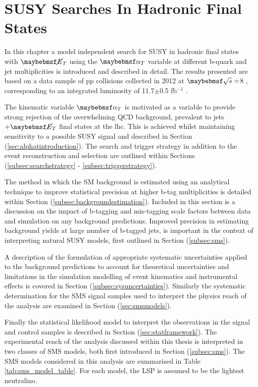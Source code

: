 \chapter{SUSY Searches In Hadronic Final States}
\label{chap:SUSYsearches}

In this chapter a model independent search for \ac{SUSY} in hadronic final states with $\met$ using the $\alphat$ variable at different b-quark and jet multiplicities is introduced and described in detail. The results presented are based on a data sample of pp collisions collected in 2012 at $\com =$8 \TeV, corresponding to an integrated luminosity of 11.7$\pm$0.5 fb$^{-1}$ \cite{ra1_epjc}.

The kinematic variable $\alphat$ is motivated as a variable to provide strong rejection of the overwhelming QCD background, prevalent to jets $+ \met$ final states at the \ac{lhc}. This is achieved whilst maintaining sensitivity to a possible \ac{SUSY} signal and described in Section (\ref{sec:alphatintroduction}). The search and trigger strategy in addition to the event reconstruction and selection are outlined within Sections (\ref{subsec:searchstrategy} - \ref{subsec:triggerstrategy}). 

The method in which the \ac{SM} background is estimated using an analytical technique to improve statistical precision at higher b-tag multiplicities is detailed within Section (\ref{subsec:backgroundestimation}). Included in this section is a discussion on the impact of b-tagging and mis-tagging scale factors between data and simulation on any background predictions. Improved precision in estimating background yields at large number of b-tagged jets, is important in the context of interpreting natural \ac{SUSY} models, first outlined in Section (\ref{subsec:sms}).

A description of the formulation of appropriate systematic uncertainties applied to the background predictions to account for theoretical uncertainties and limitations in the simulation modelling of event kinematics and instrumental effects is covered in Section (\ref{subsec:sysuncertainties}). Similarly the systematic determination for the \ac{SMS} signal samples used to interpret the physics reach of the analysis are examined in Section (\ref{sec:smsmodels}).

Finally the statistical likelihood model to interpret the observations in the signal and control samples is described in Section (\ref{sec:statframework}). The experimental reach of the analysis discussed within this thesis is interpreted in two classes of \ac{SMS} models, both first introduced in Section (\ref{subsec:sms}). The \ac{SMS} models considered in this analysis are summarised in Table \ref{tab:sms_model_table}. For each model, the \ac{LSP} is assumed to be the lightest neutralino. 

